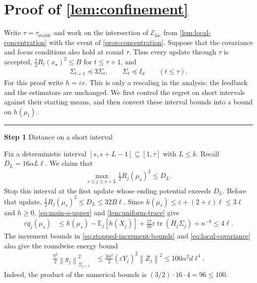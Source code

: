 \documentclass{article}
\newcommand{\proofstep}[2]{%
    \par\medskip
    \noindent
    \textcolor{blue!55!black}{\rule{2pt}{1.2em}}%
    \hspace{0.6em}%
    {\sffamily\bfseries\color{blue!55!black}Step #1}%
    \quad
    {\sffamily #2}%
    \par\smallskip
}
\newcommand{\E}{\mathbb E}
\newcommand{\tr}{\operatorname{tr}}
\newcommand{\1}{\mathbf 1}
\newcommand{\eps}{\varepsilon}
\newcommand{\norm}[1]{\left\lVert #1\right\rVert}
\newcommand{\normm}[2]{\left\lVert #1\right\rVert_{#2}}
\begin{document}
\section{Proof of \cref{lem:confinement}}
\label{app:confinement}

Write $\tau=\tau_{\mathrm{stable}}$ and work on the intersection of
$\mathcal E_{\mathrm{loc}}$ from \cref{lem:local-concentration} with the
event of \cref{prop:concentration}. Suppose that the covariance and focus
conditions also hold at round $\tau$. Thus every update through $\tau$ is
accepted, $\frac12R_t(x_\star)^2\leq B$ for $t\leq\tau+1$, and
\begin{align}
    \Sigma_{t+1}\preceq3\Sigma_t,
    \qquad\Sigma_t\preceq I_d
    \qquad(t\leq\tau).
    \label{eq:local-covariance}
\end{align}
For this proof write $h=\eps e$. This is only a rescaling in the analysis;
the feedback and the estimators are unchanged. We first control the
regret on short intervals against their starting means, and then convert
these interval bounds into a bound on $h(\mu_t)$.

\proofstep{1}{Distance on a short interval}
Fix a deterministic interval $[s,s+L-1]\subseteq[1,\tau]$ with $L\leq k$.
Recall $D_L=16\alpha L\ell$. We claim that
\begin{align}
    \max_{s\leq j\leq s+L}\frac12R_j(\mu_s)^2\leq D_L.
    \label{eq:local-distance}
\end{align}
Stop this interval at the first update whose ending potential exceeds
$D_L$. Before that update, $\frac12R_j(\mu_s)^2\leq D_L\leq32B\ell$.
Since $h(\mu_s)\leq\eps+(2+\eps)\ell\leq3\ell$ and $h\geq0$,
\eqref{eq:main-q-upper} and \cref{lem:uniform-trace} give
\begin{align}
    \eps \bar{q}_j(\mu_s)
     & \leq h(\mu_s)-\E_j[h(X_j)]
    +\frac{17}{16}\eps\tr(\bar{H}_j\Sigma_j)+n^{-8}
    \leq4\ell.
    \label{eq:local-q-upper}
\end{align}
The increment bounds in \eqref{eq:stopped-increment-bounds} and
\eqref{eq:local-covariance} also give the roundwise energy bound
\begin{align}
    \frac{\eta^2}{2}\normm{g_j}{\Sigma_{j+1}}^2
     & \leq\frac{3\alpha^2}{2}(\eps Y_j)^2\norm{Z_j}^2
    \leq100\alpha^2d\ell^4.
    \label{eq:local-energy}
\end{align}
Indeed, the product of the numerical bounds is
$(3/2)\cdot16\cdot4=96\leq100$.
\end{document}
